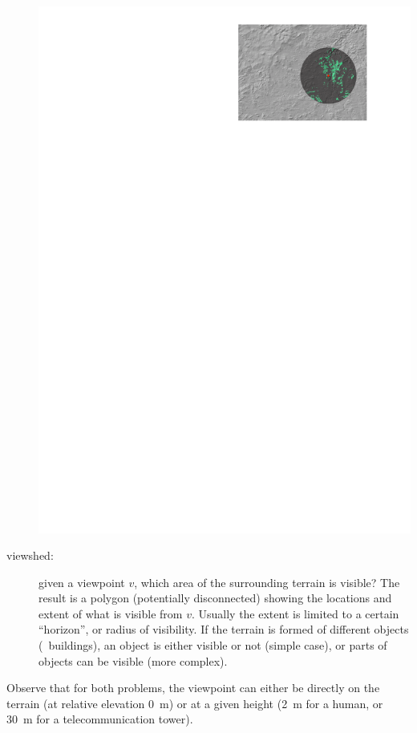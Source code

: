 \begin{description}
\begin{marginfigure}
    \includegraphics[width=\linewidth]{overview_viewshed}
    \caption{The viewshed at the location marked with a red star (green = visible; maximum view distance (dark grey) is set to \qty{15}{\km}).}%
  \label{fig:overview_viewshed}
  \end{marginfigure} 
  \item[viewshed:] given a viewpoint $v$, which area of the surrounding terrain is visible? The result is a polygon (potentially disconnected) showing the locations and extent of what is visible from $v$. Usually the extent is limited to a certain ``horizon'', or radius of visibility. If the terrain is formed of different objects (\eg\ buildings), an object is either visible or not (simple case), or parts of objects can be visible (more complex).
\end{description}
Observe that for both problems, the viewpoint can either be directly on the terrain (at relative elevation \qty{0}{\m}) or at a given height (\qty{2}{\m} for a human, or \qty{30}{\m} for a telecommunication tower).

